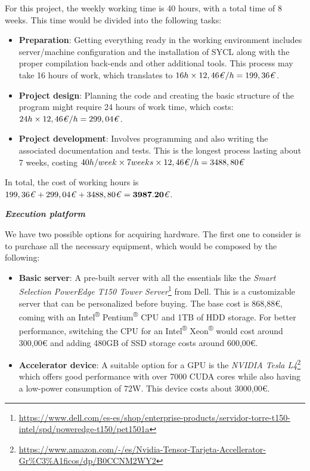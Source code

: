 For this project, the weekly working time is 40 hours, with a total time of 8 weeks.
This time would be divided into the following tasks:
\begin{itemize}
    \item \textbf{Preparation}: Getting everything ready in the working environment includes server/machine configuration and the installation of SYCL along with the proper compilation back-ends and other additional tools.
    This process may take 16 hours of work, which translates to \(16h \times 12,46\text{\textit{€}}/h = 199,36\text{\textit{€}}\).
    \item \textbf{Project design}: Planning the code and creating the basic structure of the program might require 24 hours of work time, which costs: \(24h \times 12,46\text{\textit{€}}/h = 299,04\text{\textit{€}}\).
    \item \textbf{Project development}: Involves programming and also writing the associated documentation and tests.
    This is the longest process lasting about 7 weeks, costing  \(40h/week \times 7 weeks \times 12,46\text{\textit{€}}/h = 3488,80\text{\textit{€}}\)
\end{itemize}

In total, the cost of working hours is \(199,36\text{\textit{€}} +  299,04\text{\textit{€}} + 3488,80\text{\textit{€}} = \mathbf{3987.20}\text{\textit{€}}\).

\vspace{5mm}
\textsl{\textbf{{Execution platform}}}
\vspace{2mm}

We have two possible options for acquiring hardware.
The first one to consider is to purchase all the necessary equipment, which would be composed by the following:
\begin{itemize}
    \item \textbf{Basic server}: A pre-built server with all the essentials like the \textit{Smart Selection PowerEdge T150 Tower Server}\footnote{\url{https://www.dell.com/es-es/shop/enterprise-products/servidor-torre-t150-intel/spd/poweredge-t150/pet1501a}} from Dell.
    This is a customizable server that can be personalized before buying.
    The base cost is 868,88€, coming with an Intel\textsuperscript{®} Pentium\textsuperscript{®} CPU and 1TB of HDD storage.
    For better performance, switching the CPU for an Intel\textsuperscript{®} Xeon\textsuperscript{®} would cost around 300,00€ and adding 480GB of SSD storage costs around 600,00€.
    \item \textbf{Accelerator device}: A suitable option for a GPU is the \textit{NVIDIA Tesla L4}\footnote{\url{https://www.amazon.com/-/es/Nvidia-Tensor-Tarjeta-Accellerator-Gr\%C3\%A1ficos/dp/B0CCNM2WY2}} which offers good performance with over 7000 CUDA cores while also having a low-power consumption of 72W.
    This device costs about 3000,00€.
\end{itemize}

